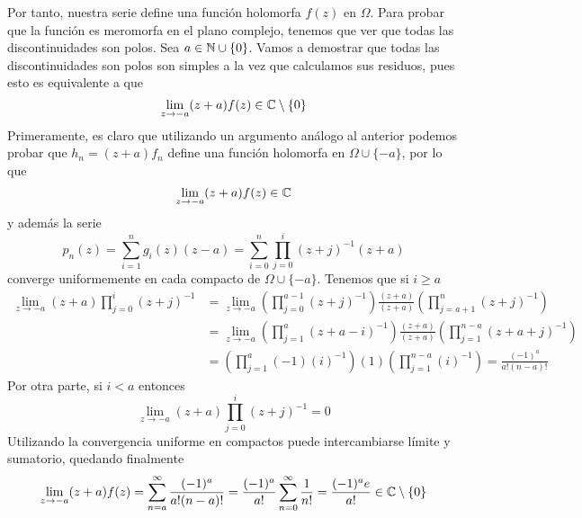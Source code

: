 \documentclass[twoside]{article}
\begin{document}
\begin{ejercicio}{1}
\begin{solucion}
Por tanto, nuestra serie define una función holomorfa $f(z)$ en $\Omega$. Para probar que la función es meromorfa en el plano complejo, tenemos que ver que todas las discontinuidades son polos. Sea $a\in \mathbb{N}\cup\{0\}$. Vamos a demostrar que todas las discontinuidades son polos son simples a la vez que calculamos sus residuos, pues esto es equivalente a que 
$$
\lim_{z\to -a}(z+a)f(z) \in\mathbb{C}\setminus\{0\}
$$
Primeramente, es claro que utilizando un argumento análogo al anterior podemos probar que $h_n = (z+a)f_n$ define una función holomorfa en $\Omega \cup\{-a\}$, por lo que 
$$
\lim_{z\to -a}(z+a)f(z) \in\mathbb{C}
$$
y además la serie
$$
p_n(z) = \sum_{i=1}^n g_i(z) (z-a) = \sum_{i=0}^n \prod_{j=0}^i (z+j)^{-1}(z+a)
$$
converge uniformemente en cada compacto de $\Omega\cup\{-a\}$.  Tenemos que si $i\geq a$
\begin{align*}
\lim_{z\to -a}(z+a)\prod_{j=0}^i \left(z+j\right)^{-1}& =  \lim_{z\rightarrow-a}\left(\prod_{j=0}^{a-1}(z+j)^{-1}\right)\frac{(z+a)}{(z+a)}\left(\prod_{j=a+1}^{n}(z+j)^{-1}\right)\\
&=\lim_{z\rightarrow-a}\left(\prod_{j=1}^{a}(z+a-i)^{-1}\right)\frac{(z+a)}{(z+a)}\left(\prod_{j=1}^{n-a}(z+a+j)^{-1}\right) \\
&=\left(\prod_{j=1}^{a}(-1)(i)^{-1}\right)(1)\left(\prod_{j=1}^{n-a}(i)^{-1}\right)=\frac{(-1)^a}{a!(n-a)!}
\end{align*}
Por otra parte, si $i<a$ entonces
$$
\lim_{z\to -a}(z+a)\prod_{j=0}^i \left(z+j\right)^{-1} = 0
$$
Utilizando la convergencia uniforme en compactos puede intercambiarse límite y sumatorio, quedando finalmente
$$
\lim_{z\to -a}(z+a)f(z) = \sum_{n=a}^\infty \frac{(-1)^a}{a!(n-a)!} = \frac{(-1)^a}{a!}\sum_{n=0}^\infty \frac{1}{n!} = \frac{(-1)^a e}{a!} \in \mathbb{C}\setminus\{0\}
$$
\end{solucion}
\end{ejercicio}
\end{document}
